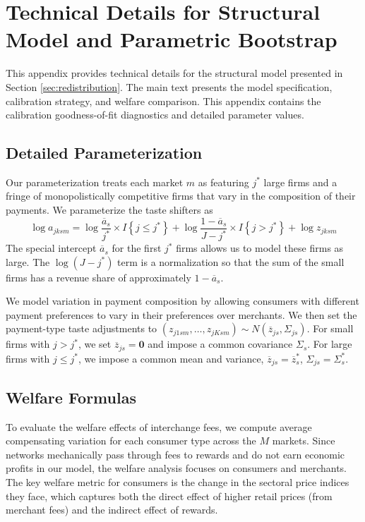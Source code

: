 \documentclass[main.tex]{subfiles}
\begin{document}
\section{Technical Details for Structural Model and Parametric Bootstrap}\label{sec:appendix-calibrated}

This appendix provides technical details for the structural model presented in Section \ref{sec:redistribution}.
The main text presents the model specification, calibration strategy, and welfare comparison.
This appendix contains the calibration goodness-of-fit diagnostics and detailed parameter values.

\subsection{Detailed Parameterization}

Our parameterization treats each market $m$ as featuring $j^{*}$ large firms and a fringe of monopolistically competitive firms that vary in the composition of their payments.
We parameterize the taste shifters as
\[
\log a_{jksm}=\log\frac{\overline{a}_{s}}{j^{*}}\times I\left\{ j\leq j^{*}\right\} +\log\frac{1-\overline{a}_{s}}{J-j^{*}}\times I\left\{ j>j^{*}\right\} +\log z_{jksm}
\]
The special intercept $\overline{a}_{s}$ for the first $j^{*}$ firms allows us to model these firms as large.
The $\log(J-j^{*})$ term is a normalization so that the sum of the small firms has a revenue share of approximately $1-\overline{a}_{s}$.

We model variation in payment composition by allowing consumers with different payment preferences to vary in their preferences over merchants.
We then set the payment-type taste adjustments to $\left(z_{j1sm},\dots,z_{jKsm}\right)\sim N\left(\overline{z}_{js},\Sigma_{js}\right)$.
For small firms with $j>j^{*}$, we set $\overline{z}_{js}=\mathbf{0}$ and impose a common covariance $\Sigma_{s}$.
For large firms with $j\leq j^{*}$, we impose a common mean and variance, $\overline{z}_{js}=\overline{z}_{s}^{*}$, $\Sigma_{js}=\Sigma_{s}^{*}$.

\subsection{Welfare Formulas}

To evaluate the welfare effects of interchange fees, we compute average compensating variation for each consumer type across the $M$ markets.
Since networks mechanically pass through fees to rewards and do not earn economic profits in our model, the welfare analysis focuses on consumers and merchants.
The key welfare metric for consumers is the change in the sectoral price indices they face, which captures both the direct effect of higher retail prices (from merchant fees) and the indirect effect of rewards.
\end{document}
